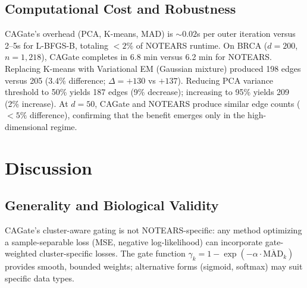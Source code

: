 \documentclass[12pt,a4paper]{article}
\begin{document}
\subsection{Computational Cost and Robustness}









CAGate's overhead (PCA, K-means, MAD) is $\sim 0.02$s per outer iteration versus 2--5s for L-BFGS-B, totaling $<2\%$ of NOTEARS runtime. On BRCA ($d=200$, $n=1,218$), CAGate completes in 6.8 min versus 6.2 min for NOTEARS. Replacing K-means with Variational EM (Gaussian mixture) produced 198 edges versus 205 (3.4\% difference; $\Delta=+130$ vs $+137$). Reducing PCA variance threshold to 50\% yields 187 edges (9\% decrease); increasing to 95\% yields 209 (2\% increase). At $d=50$, CAGate and NOTEARS produce similar edge counts ($<5\%$ difference), confirming that the benefit emerges only in the high-dimensional regime.













\section{Discussion}









\subsection{Generality and Biological Validity}









CAGate's cluster-aware gating is not NOTEARS-specific: any method optimizing a sample-separable loss (MSE, negative log-likelihood) can incorporate gate-weighted cluster-specific losses. The gate function $\gamma_k = 1 - \exp(-\alpha \cdot \overline{\text{MAD}}_k)$ provides smooth, bounded weights; alternative forms (sigmoid, softmax) may suit specific data types.
\end{document}
